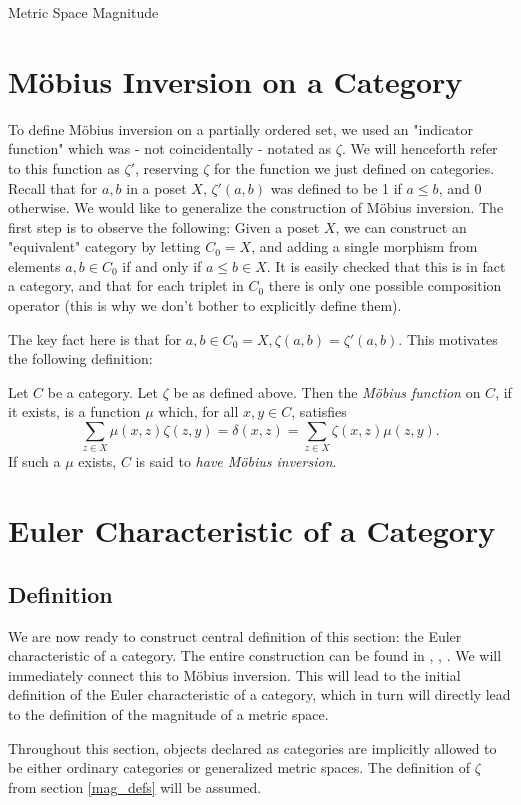 \documentclass[12pt]{pom_thesis}
\begin{document}
\begin{chapter}{Metric Space Magnitude}
\section{M\"obius Inversion on a Category}
To define M\"obius inversion on a partially ordered set, we used an "indicator function" which was - not coincidentally - notated as $\zeta$. We will henceforth refer to this function as $\zeta'$, reserving $\zeta$ for the function we just defined on categories. Recall that for $a,b$ in a poset $X$, $\zeta'(a,b)$ was defined to be 1 if $a \leq b$, and 0 otherwise. We would like to generalize the construction of M\"obius inversion. The first step is to observe the following: Given a poset $X$, we can construct an "equivalent" category by letting $C_0=X$, and adding a single morphism from elements $a,b \in C_0$ if and only if $a \leq b \in X$. It is easily checked that this is in fact a category, and that for each triplet in $C_0$ there is only one possible composition operator (this is why we don't bother to explicitly define them). 

The key fact here is that for $a,b \in C_0 = X, \zeta(a,b) = \zeta'(a,b)$. This motivates the following definition:
\begin{defn}\label{cat_mob} %
Let $C$ be a category. Let $\zeta$ be as defined above. Then the \emph{M\"obius function} on $C$, if it exists, is a function $\mu$ which, for all $x,y \in C$, satisfies
\[
\sum_{z \in X} \mu(x,z)\zeta(z,y) = \delta(x,z) = \sum_{z \in X} \zeta(x,z)\mu(z,y).
\]
If such a $\mu$ exists, $C$ is said to \emph{have M\"obius inversion}.
\end{defn}
\section{Euler Characteristic of a Category}
\subsection{Definition}
We are now ready to construct central definition of this section: the Euler characteristic of a category. The entire construction can be found in \cite{Lein1}, \cite{Lein2}, \cite{Lein4}. We will immediately connect this to M\"obius inversion. This will lead to the initial definition of the Euler characteristic of a category, which in turn will directly lead to the definition of the magnitude of a metric space.

Throughout this section, objects declared as categories are implicitly allowed to be either ordinary categories or generalized metric spaces. The definition of $\zeta$ from section \ref{mag_defs} will be assumed.


\end{chapter}
\end{document}
